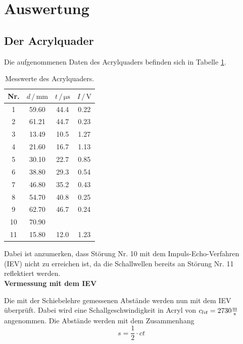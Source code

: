 \newpage
\section{Auswertung}
\label{sec:Auswertung}
\subsection{Der Acrylquader}
Die aufgenommenen Daten des Acrylquaders befinden sich in Tabelle \ref{tab:1}.
\begin{table}
    \centering
    \caption{Messwerte des Acrylquaders.}
    \begin{tabular}{c c c c}
        \toprule
        {Nr.} & {$d \, / \, \si{\milli\meter}$} & {$t \, / \, \si{\micro\second} $} & {$I \, / \, \si{\volt}$} \\
        \midrule
     1  & 59.60    &    44.4   &     0.22\\
     2  & 61.21   &    44.7   &     0.23\\
     3  & 13.49   &    10.5   &     1.27\\
     4  & 21.60    &    16.7   &     1.13\\
     5  & 30.10    &    22.7   &     0.85\\
     6  & 38.80    &    29.3   &     0.54\\
     7  & 46.80    &    35.2   &     0.43\\
     8  & 54.70    &    40.8   &     0.25\\
     9  & 62.70    &    46.7   &     0.24\\    
     10 & 70.90    &           &         \\
     11 & 15.80    &    12.0     &     1.23\\
        \bottomrule
    \end{tabular}
    \label{tab:1}
\end{table}

\noindent
Dabei ist anzumerken, dass Störung Nr. 10 mit dem Impuls-Echo-Verfahren (IEV) nicht zu erreichen ist, 
da die Schallwellen bereits an Störung Nr. 11 reflektiert werden. \\

\noindent
\textbf{Vermessung mit dem IEV}

\noindent
Die mit der Schiebelehre gemessenen Abstände werden nun mit dem IEV überprüft.
Dabei wird eine Schallgeschwindigkeit in Acryl von $c_{lit} = 2730 \si[per-mode=fraction]{\meter\per\second}$ angenommen.
Die Abstände werden mit dem Zusammenhang
\begin{equation}
    s = \frac{1}{2} \cdot c t
    \label{eqn:position_fehlstelle}
\end{equation}

